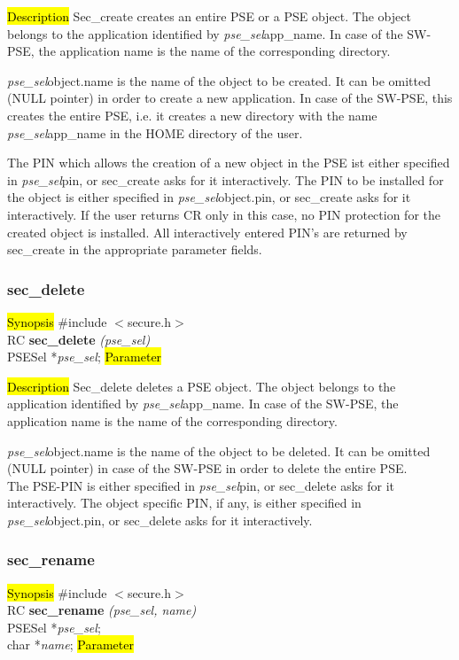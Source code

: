 \hl{Description}
Sec\_create creates an entire PSE or a PSE object. 
The object belongs to the application identified by {\em pse\_sel}\pf app\_name.
In case of the SW-PSE, the application name is the name of the corresponding directory. 

{\em pse\_sel}\pf object.name is the name of the object to be created. It can be omitted 
(NULL pointer) in order to create a new application. In case of the SW-PSE, 
this creates the entire PSE, i.e. it creates a new directory
with the name {\em pse\_sel}\pf app\_name in the HOME directory of
the user. 
 
The PIN which allows the creation of a new object in the PSE ist either specified in
{\em pse\_sel}\pf pin, or sec\_create asks for it interactively.
The PIN to be installed for the object
is either specified in {\em pse\_sel}\pf object.pin, or sec\_create asks for it interactively.
If the user returns CR only in this case, no PIN protection for the created object
is installed. All interactively entered PIN's are returned by sec\_create in the appropriate
parameter fields.

\subsubsection{sec\_delete}
\label{sec_delete}
\hl{Synopsis}
\#include $<$secure.h$>$ \\ [0.5cm]
RC {\bf sec\_delete} {\em (pse\_sel)} \\
PSESel *{\em pse\_sel};
\hl{Parameter}

\hl{Description}
Sec\_delete deletes a PSE object. 
The object belongs to the application identified by {\em pse\_sel}\pf app\_name.
In case of the SW-PSE, the application name is the name of the corresponding directory. 

{\em pse\_sel}\pf object.name is the name of the object to be deleted. It can be omitted 
(NULL pointer) in case of the SW-PSE in order to delete the entire PSE. \\[1ex]
The PSE-PIN is either specified in
{\em pse\_sel}\pf pin, or sec\_delete asks for it interactively.
The object specific PIN, if any, is either specified in {\em pse\_sel}\pf object.pin, 
or sec\_delete asks for it interactively.

\subsubsection{sec\_rename}
\label{sec_rename}
\hl{Synopsis}
\#include $<$secure.h$>$ \\ [0.5cm]
RC {\bf sec\_rename} {\em (pse\_sel, name)} \\
PSESel *{\em pse\_sel}; \\
char  *{\em name};
\hl{Parameter}


